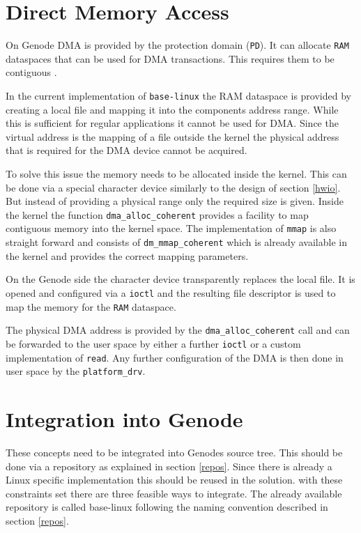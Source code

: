 \documentclass[
a4paper,
12pt,
notitlepage,
parskip=half,
DIV=11,
]{scrbook}
\begin{document}
		\section{Direct Memory Access}
		
		On Genode DMA is provided by the protection domain (\texttt{PD}).
		It can allocate \texttt{RAM} dataspaces that can be used for DMA transactions.
		This requires them to be contiguous \citep{genode}.
		
		In the current implementation of \texttt{base-linux} the RAM dataspace is provided by creating a local file and mapping it into the components address range.
		While this is sufficient for regular applications it cannot be used for DMA.
		Since the virtual address is the mapping of a file outside the kernel the physical address that is required for the DMA device cannot be acquired.
		
		To solve this issue the memory needs to be allocated inside the kernel.
		This can be done via a special character device similarly to the design of section \ref{hwio}.
		But instead of providing a physical range only the required size is given.
		Inside the kernel the function \texttt{dma\_alloc\_coherent} provides a facility to map contiguous memory into the kernel space.
		The implementation of \texttt{mmap} is also straight forward and consists of \texttt{dm\_mmap\_coherent} which is already available in the kernel and provides the correct mapping parameters. \citep{books/daglib/0012446}
		
		On the Genode side the character device transparently replaces the local file.
		It is opened and configured via a \texttt{ioctl} and the resulting file descriptor is used to map the memory for the \texttt{RAM} dataspace.
		
		The physical DMA address is provided by the \texttt{dma\_alloc\_coherent} call and can be forwarded to the user space by either a further \texttt{ioctl} or a custom implementation of \texttt{read}.
		Any further configuration of the DMA is then done in user space by the \texttt{platform\_drv}.
		
		\section{Integration into Genode}
		
		These concepts need to be integrated into Genodes source tree.
		This should be done via a repository as explained in section \ref{repos}.
		Since there is already a Linux specific implementation this should be reused in the solution.
		with these constraints set there are three feasible ways to integrate.
		The already available repository is called base-linux following the naming convention described in section \ref{repos}.
		
\end{document}
